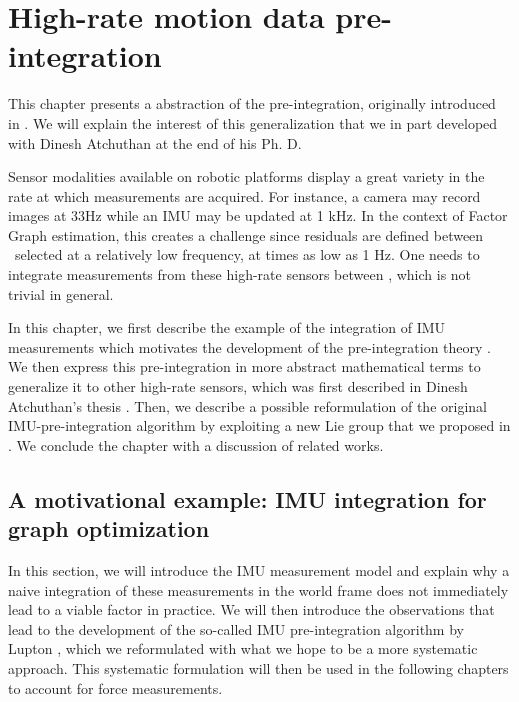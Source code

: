 \chapter{High-rate motion data pre-integration}
\label{chp:pre-integration}
\minitoc
\bigskip

This chapter presents a abstraction of the pre-integration, originally introduced in \cite{lupton-09, forster2015imu}. We will explain
the interest of this generalization that we in part developed with Dinesh Atchuthan at the end of his Ph. D.

Sensor modalities available on robotic platforms display a great variety in the rate at which measurements are acquired. For instance, 
a camera may record images at 33Hz while an IMU may be updated at 1 kHz. In the context of Factor Graph estimation, this creates a challenge since residuals
are defined between \keyframes\ selected at a relatively low frequency, at times as low as 1 Hz. One needs to integrate measurements from these high-rate sensors between \keyframes,
which is not trivial in general.

In this chapter, we first describe the example of the integration of IMU measurements which motivates the development of the pre-integration theory \cite{lupton-09,forster2017-TRO}.
We then express this pre-integration in more abstract mathematical terms to generalize it to other high-rate sensors, which was first described in Dinesh Atchuthan's thesis \cite{atchuthan-18-thesis}. 
Then, we describe a possible reformulation of the original IMU-pre-integration algorithm \cite{forster2017-TRO} by exploiting a new Lie group that we 
proposed in \cite{fourmy2019absolute}. We conclude the chapter with a discussion of related works.

  
\section{A motivational example: IMU integration for graph optimization}
\label{sec:imu_preint_motivation}

In this section, we will introduce the IMU measurement model and explain why a naive integration of these measurements in the world frame does not immediately
lead to a viable factor in practice. We will then introduce the observations that lead to the development of the so-called IMU pre-integration algorithm by Lupton \cite{lupton-09},
which we reformulated with what we hope to be a more systematic approach. This systematic formulation will then be used 
in the following chapters to account for force measurements.

